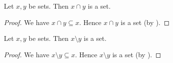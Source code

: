 \documentclass[10pt]{article}
\begin{document}
  \begin{forthel}
    \begin{proposition}[id=FOUNDATIONS_10_4475839687163904,printid]
      Let $x, y$ be sets.
      Then $x \cap y$ is a set.
    \end{proposition}
    \begin{proof}
      We have $x \cap y \subseteq x$.
      Hence $x \cap y$ is a set (by ).
    \end{proof}
  \end{forthel}

  \begin{forthel}
    \begin{proposition}[id=FOUNDATIONS_10_7795203882614784,printid]
      Let $x, y$ be sets.
      Then $x \setminus y$ is a set.
    \end{proposition}
    \begin{proof}
      We have $x \setminus y \subseteq x$.
      Hence $x \setminus y$ is a set (by ).
    \end{proof}
  \end{forthel}
\end{document}
